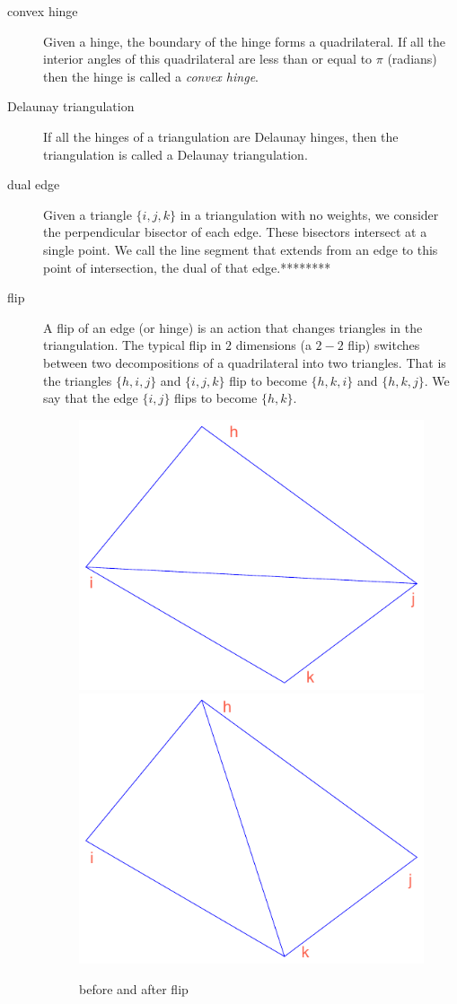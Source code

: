 \documentclass{article}%
\begin{document}


\renewcommand{\qedsymbol}{\smiley}

\begin{description}


\item[convex hinge]  Given a hinge, the boundary of the hinge forms a
quadrilateral. If all the interior angles of this quadrilateral are less than
or equal to $\pi$ (radians) then the hinge is called a \emph{convex hinge}.

\item[Delaunay triangulation]  If all the hinges of a triangulation are
Delaunay hinges, then the triangulation is called a Delaunay triangulation.

\item[dual edge]  Given a triangle $\{i,j,k\}$ in a triangulation with no
weights, we consider the perpendicular bisector of each edge. These bisectors
intersect at a single point. We call the line segment that extends from an
edge to this point of intersection, the dual of that edge.********



\item[flip]  A flip of an edge (or hinge) is an action that changes triangles
in the triangulation. The typical flip in $2$ dimensions (a $2-2$ flip)
switches between two decompositions of a quadrilateral into two triangles.
That is the triangles $\{h,i,j\}$ and $\{i,j,k\}$ flip to become $\{h,k,i\}$
and $\{h,k,j\}$. We say that the edge $\{i,j\}$ flips to become $\{h,k\}.$
\begin{figure}[ptbh]
\centering
\includegraphics[height=.8in]{convex_hinge_nondelaunay.pdf}
\includegraphics[height=.8in]{convex_hinge_delaunay.pdf}   \caption{before and
after flip}%
\label{fig:convex_hinge_nondelaunay}%
\end{figure}


\end{description}
\end{document}

